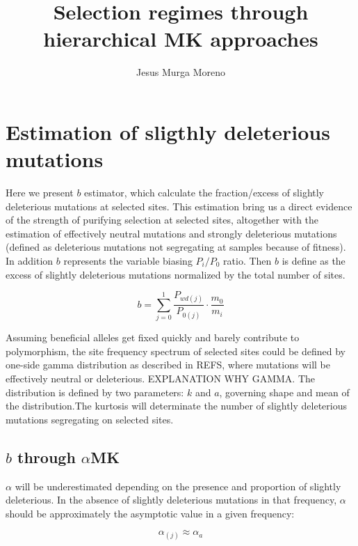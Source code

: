 \documentclass[11pt]{article}
\begin{document}
   

\title{Selection regimes through hierarchical MK approaches}    
\author{Jesus Murga Moreno}

\maketitle

\section{Estimation of sligthly deleterious mutations}    
	
	Here we present $b$ estimator, which calculate the fraction/excess of slightly deleterious mutations at selected sites. This estimation bring us a direct evidence of the strength of purifying selection at selected sites, altogether with the estimation of effectively neutral mutations and strongly deleterious mutations (defined as deleterious mutations not segregating at samples because of fitness). In addition $b$ represents the variable biasing $P_{i}/P_{0}$ ratio. Then $b$ is define as the excess of slightly deleterious mutations normalized by the total number of sites.
	
\begin{equation}
	b = \sum_{j=0}^{1}\frac{P_{wd(j)}}{P_{0(j)}}\cdot\frac{m_{0}}{m_{i}}
\end{equation}

Assuming beneficial alleles get fixed quickly and barely contribute to polymorphism, the site frequency spectrum of selected sites could be defined by one-side gamma distribution as described in REFS, where mutations will be effectively neutral or deleterious. EXPLANATION WHY GAMMA. The distribution is defined by two parameters: $k$ and $a$, governing shape and mean of the distribution.The kurtosis will determinate the number of slightly deleterious mutations segregating on selected sites. 


\subsection{$b$ through $\alpha$MK}
$\alpha$ will be underestimated depending on the presence and proportion of slightly deleterious. In the absence of slightly deleterious mutations in that frequency, $\alpha$ should be approximately the asymptotic value in a given frequency:

\begin{equation}
	\alpha_{(j)} \approx \alpha_{a}
\end{equation}
\end{document}
